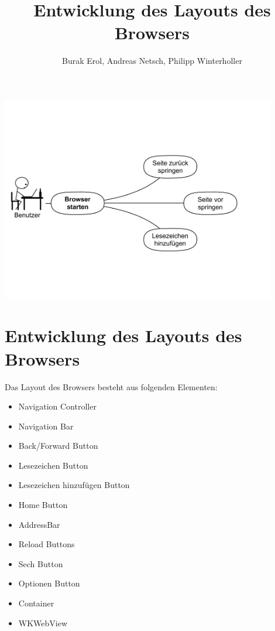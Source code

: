 
\title{Entwicklung des Layouts des Browsers}
\author{Burak Erol, Andreas Netsch, Philipp Winterholler}

\includegraphics[width=12cm]{Pics/use_case_browser}

\section{Entwicklung des Layouts des Browsers}

Das Layout des Browsers besteht aus folgenden Elementen:

\begin{itemize}
\item Navigation Controller
\item Navigation Bar
\item Back/Forward Button
\item Lesezeichen Button
\item Lesezeichen hinzufügen Button
\item Home Button
\item AddressBar
\item Reload Buttons
\item Sech Button
\item Optionen Button
\item Container
\item WKWebView
\end{itemize}
	
